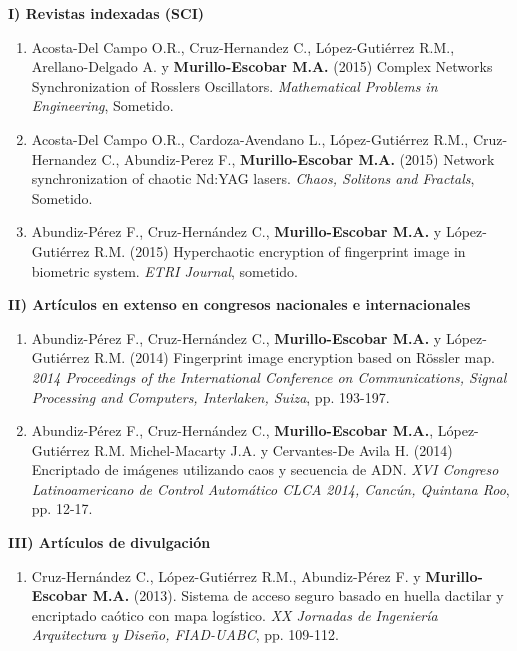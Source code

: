 \textbf{I) Revistas indexadas (SCI)}
\begin{enumerate}
\item Acosta-Del Campo O.R., Cruz-Hernandez C., López-Gutiérrez R.M., Arellano-Delgado A. y \textbf{Murillo-Escobar M.A.} (2015) Complex Networks Synchronization of Rosslers Oscillators. \textit{Mathematical Problems in Engineering}, Sometido. 

\item Acosta-Del Campo O.R., Cardoza-Avendano L., López-Gutiérrez R.M., Cruz-Hernandez C., Abundiz-Perez F., \textbf{Murillo-Escobar M.A.} (2015) Network synchronization of chaotic Nd:YAG lasers. \textit{Chaos, Solitons and Fractals}, Sometido. 

\item  Abundiz-Pérez F., Cruz-Hernández C., \textbf{Murillo-Escobar M.A.} y López-Gutiérrez R.M. (2015) Hyperchaotic encryption of fingerprint image in biometric system. \textit{ETRI Journal}, sometido.  \\
\end{enumerate}

\textbf{II) Artículos en extenso en congresos nacionales e internacionales}

\begin{enumerate}
\item Abundiz-Pérez F., Cruz-Hernández C., \textbf{Murillo-Escobar M.A.} y López-Gutiérrez R.M. (2014) Fingerprint image encryption based on Rössler map. \textit{2014 Proceedings of the International Conference on Communications, Signal Processing and Computers, Interlaken, Suiza}, pp. 193-197.

\item Abundiz-Pérez F., Cruz-Hernández C., \textbf{Murillo-Escobar M.A.}, López-Gutiérrez R.M. Michel-Macarty J.A. y Cervantes-De Avila H. (2014) Encriptado de imágenes utilizando caos y secuencia de ADN. \textit{XVI Congreso Latinoamericano de Control Automático CLCA 2014, Cancún, Quintana Roo}, pp. 12-17.  \\
\end{enumerate}

\textbf{III) Artículos de divulgación}
\begin{enumerate}
\item Cruz-Hernández C., López-Gutiérrez R.M., Abundiz-Pérez F. y \textbf{Murillo-Escobar M.A.} (2013). Sistema de acceso seguro basado en huella dactilar y encriptado caótico con mapa logístico. \textit{XX Jornadas de Ingeniería Arquitectura y Diseño, FIAD-UABC}, pp. 109-112.  \\
\end{enumerate}

